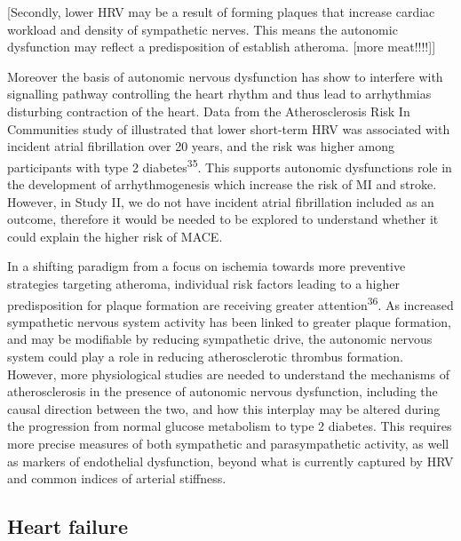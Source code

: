 \documentclass[
  a4paper,
  headsepline=true,
  open=any]{scrbook}
\begin{document}
{[}Secondly, lower HRV may be a result of forming plaques that increase
cardiac workload and density of sympathetic nerves. This means the
autonomic dysfunction may reflect a predisposition of establish
atheroma. {[}more meat!!!!{]}{]}

Moreover the basis of autonomic nervous dysfunction has show to
interfere with signalling pathway controlling the heart rhythm and thus
lead to arrhythmias disturbing contraction of the heart. Data from the
Atherosclerosis Risk In Communities study of illustrated that lower
short-term HRV was associated with incident atrial fibrillation over 20
years, and the risk was higher among participants with type 2
diabetes\textsuperscript{35}. This supports autonomic dysfunctions role
in the development of arrhythmogenesis which increase the risk of MI and
stroke. However, in Study II, we do not have incident atrial
fibrillation included as an outcome, therefore it would be needed to be
explored to understand whether it could explain the higher risk of MACE.

In a shifting paradigm from a focus on ischemia towards more preventive
strategies targeting atheroma, individual risk factors leading to a
higher predisposition for plaque formation are receiving greater
attention\textsuperscript{36}. As increased sympathetic nervous system
activity has been linked to greater plaque formation, and may be
modifiable by reducing sympathetic drive, the autonomic nervous system
could play a role in reducing atherosclerotic thrombus formation.
However, more physiological studies are needed to understand the
mechanisms of atherosclerosis in the presence of autonomic nervous
dysfunction, including the causal direction between the two, and how
this interplay may be altered during the progression from normal glucose
metabolism to type 2 diabetes. This requires more precise measures of
both sympathetic and parasympathetic activity, as well as markers of
endothelial dysfunction, beyond what is currently captured by HRV and
common indices of arterial stiffness.

\hypertarget{heart-failure-1}{%
\subsection{Heart failure}\label{heart-failure-1}}
\end{document}
